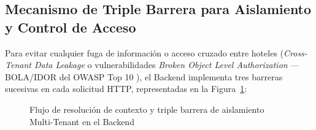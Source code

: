 \documentclass[12pt,a4paper]{article}
\begin{document}
\subsection{Mecanismo de Triple Barrera para Aislamiento y Control de Acceso}
Para evitar cualquier fuga de informaci\'on o acceso cruzado entre hoteles (\textit{Cross-Tenant Data Leakage} o vulnerabilidades \textit{Broken Object Level Authorization} --- BOLA/IDOR del OWASP Top 10 \cite{owasp2021top10}), el Backend implementa tres barreras sucesivas en cada solicitud HTTP, representadas en la Figura~\ref{fig:arquitectura_multitenant}:

\begin{figure}[H]
    \centering
    
    \caption{Flujo de resoluci\'on de contexto y triple barrera de aislamiento Multi-Tenant en el Backend}
    \label{fig:arquitectura_multitenant}
\end{figure}
\end{document}
